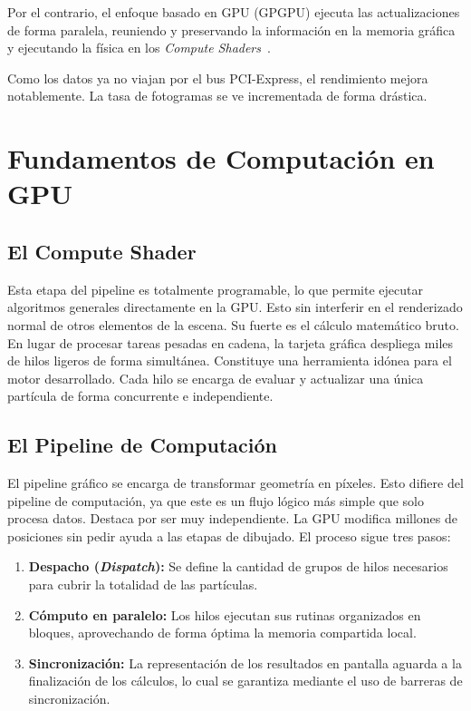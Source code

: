 Por el contrario, el enfoque basado en GPU (GPGPU) ejecuta las actualizaciones de forma paralela, reuniendo y preservando la información en la memoria gráfica 
y ejecutando la física en los \textit{Compute Shaders}~\parencite{akenine2018real}.

Como los datos ya no viajan por el bus PCI-Express, el rendimiento mejora notablemente. La tasa de fotogramas se ve incrementada de forma drástica.


\section{Fundamentos de Computación en GPU}


\subsection{El Compute Shader}
\label{subsection:ElComputeShader}

Esta etapa del pipeline es totalmente programable, lo que permite ejecutar algoritmos generales directamente en la GPU.
Esto sin interferir en el renderizado normal de otros elementos de la escena. 
Su fuerte es el cálculo matemático bruto. En lugar de procesar tareas pesadas en cadena, la tarjeta gráfica despliega miles de hilos ligeros de forma simultánea. 
Constituye una herramienta idónea para el motor desarrollado. Cada hilo se encarga de evaluar y actualizar una única partícula de forma concurrente e independiente.


\subsection{El Pipeline de Computación}
El pipeline gráfico se encarga de transformar geometría en píxeles. 
Esto difiere del pipeline de computación, ya que este es un flujo lógico más simple que solo procesa datos.
Destaca por ser muy independiente. La GPU modifica millones de posiciones sin pedir ayuda a las etapas de dibujado. El proceso sigue tres pasos:
\begin{enumerate}
    \item \textbf{Despacho (\textit{Dispatch}):} Se define la cantidad de grupos de hilos necesarios para cubrir la totalidad de las partículas.
    \item \textbf{Cómputo en paralelo:} Los hilos ejecutan sus rutinas organizados en bloques, aprovechando de forma óptima la memoria compartida local. 
    \item \textbf{Sincronización:} La representación de los resultados en pantalla aguarda a la finalización de los cálculos, lo cual se garantiza mediante el uso de barreras de sincronización.
\end{enumerate}


